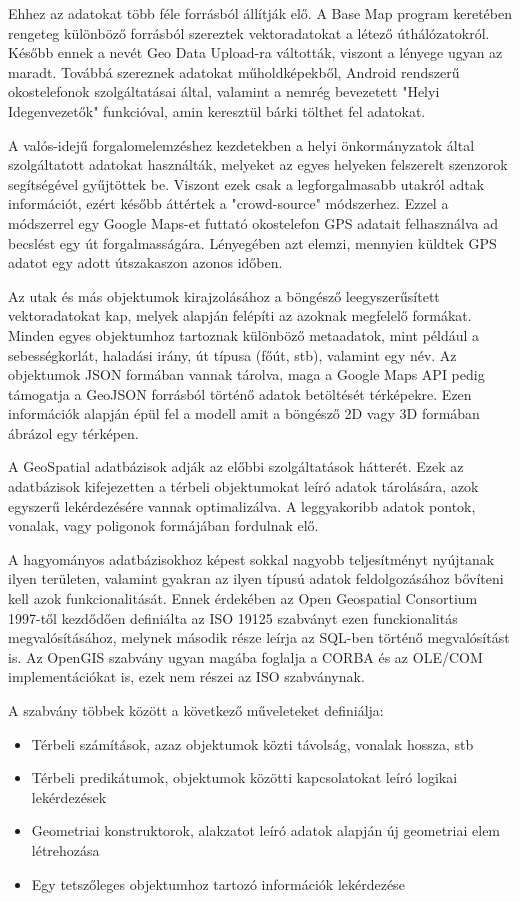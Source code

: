 Ehhez az adatokat több féle forrásból állítják elő. A Base Map program keretében rengeteg különböző forrásból
szereztek vektoradatokat a létező úthálózatokról. Később ennek a nevét Geo Data Upload-ra váltották, viszont a lényege ugyan az maradt.
Továbbá szereznek adatokat műholdképekből, Android rendszerű okostelefonok szolgáltatásai által, valamint a nemrég bevezetett "Helyi Idegenvezetők" funkcióval, amin keresztül
bárki tölthet fel adatokat. 

A valós-idejű forgalomelemzéshez kezdetekben a helyi önkormányzatok által szolgáltatott adatokat használták, melyeket az egyes helyeken felszerelt
szenzorok segítségével gyűjtöttek be. Viszont ezek csak a legforgalmasabb utakról adtak információt, ezért később áttértek a "crowd-source" módszerhez. Ezzel a módszerrel egy
Google Maps-et futtató okostelefon GPS adatait felhasználva ad becslést egy út forgalmasságára. Lényegében azt elemzi, mennyien küldtek GPS adatot egy adott útszakaszon azonos időben.

Az utak és más objektumok kirajzolásához a böngésző leegyszerűsített vektoradatokat kap, melyek alapján felépíti az azoknak megfelelő formákat.
Minden egyes objektumhoz tartoznak különböző metaadatok, mint például a sebességkorlát, haladási irány, út típusa (főút, stb), valamint egy név. Az objektumok JSON formában vannak
tárolva, maga a Google Maps API pedig támogatja a GeoJSON forrásból történő adatok betöltését térképekre.
Ezen információk alapján épül fel a modell amit a böngésző 2D vagy 3D formában ábrázol egy térképen.

A GeoSpatial adatbázisok adják az előbbi szolgáltatások hátterét. Ezek az adatbázisok kifejezetten a térbeli objektumokat leíró adatok tárolására, azok egyszerű lekérdezésére
vannak optimalizálva. A leggyakoribb adatok pontok, vonalak, vagy poligonok formájában fordulnak elő. 

A hagyományos adatbázisokhoz képest sokkal nagyobb teljesítményt nyújtanak
ilyen területen, valamint gyakran az ilyen típusú adatok feldolgozásához bővíteni kell azok funkcionalitását. Ennek érdekében az Open Geospatial Consortium 1997-től kezdődően
definiálta az ISO 19125 szabványt ezen funckionalitás megvalósításához, melynek második része leírja az SQL-ben történő megvalósítást is. Az OpenGIS szabvány ugyan magába
foglalja a CORBA és az OLE/COM implementációkat is, ezek nem részei az ISO szabványnak.

A szabvány többek között a következő műveleteket definiálja:
\begin{itemize}
\item Térbeli számítások, azaz objektumok közti távolság, vonalak hossza, stb
\item Térbeli predikátumok, objektumok közötti kapcsolatokat leíró logikai lekérdezések
\item Geometriai konstruktorok, alakzatot leíró adatok alapján új geometriai elem létrehozása
\item Egy tetszőleges objektumhoz tartozó információk lekérdezése
\end{itemize}

